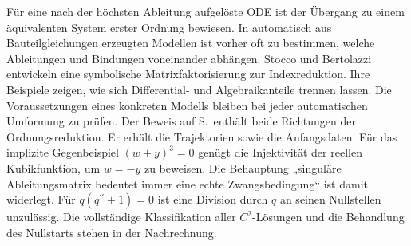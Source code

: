 
Für eine nach der höchsten Ableitung aufgelöste ODE ist der Übergang zu einem äquivalenten System erster Ordnung bewiesen. In automatisch aus Bauteilgleichungen erzeugten Modellen ist vorher oft zu bestimmen, welche Ableitungen und Bindungen voneinander abhängen. Stocco und Bertolazzi entwickeln eine symbolische Matrixfaktorisierung zur Indexreduktion. Ihre Beispiele zeigen, wie sich Differential- und Algebraikanteile trennen lassen. Die Voraussetzungen eines konkreten Modells bleiben bei jeder automatischen Umformung zu prüfen.
Der Beweis auf S.\, enthält beide Richtungen der Ordnungsreduktion. Er erhält die Trajektorien sowie die Anfangsdaten. Für das implizite Gegenbeispiel \((w+y)^3=0\) genügt die Injektivität der reellen Kubikfunktion, um \(w=-y\) zu beweisen. Die Behauptung „singuläre Ableitungsmatrix bedeutet immer eine echte Zwangsbedingung“ ist damit widerlegt.
Für \(q(q^{\prime\prime}+1)=0\) ist eine Division durch \(q\) an seinen Nullstellen unzulässig. Die vollständige Klassifikation aller \(C^2\)-Lösungen und die Behandlung des Nullstarts stehen in der Nachrechnung.

